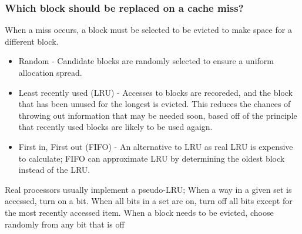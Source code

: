 \documentclass[11pt, a4paper]{article}
\theoremstyle{definition}
\theoremstyle{remark}
\begin{document}
\subsubsection{Which block should be replaced on a cache miss?}
When a miss occurs, a block must be selected to be evicted to make space for a different block. 
\begin{itemize} 
  \item Random - Candidate blocks are randomly selected to ensure a uniform allocation spread. 
  \item Least recently used (LRU) - Accesses to blocks are recoreded, and the block that has been unused for the longest is evicted. This reduces the chances of throwing out information that may be needed soon, based off of the principle that recently used blocks are likely to be used agaign.
  \item First in, First out (FIFO) - An alternative to LRU as real LRU is expensive to calculate; FIFO can approximate LRU by determining the oldest block instead of the LRU.
\end{itemize}
Real processors usually implement a pseudo-LRU; When a way in a given set is accessed, turn on a bit. When all bits in a set are on, turn off all bits except for the most recently accessed item. When a block needs to be evicted, choose randomly from any bit that is off
\end{document}
